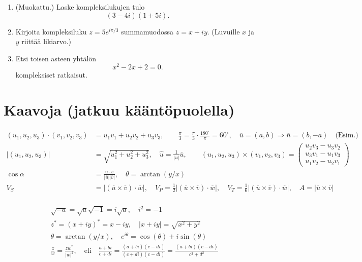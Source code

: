 \documentclass[12pt]{article}
\newcommand{\hatu}{\hat{u}}
\newcommand{\vu}{\overline{u}}
\newcommand{\vv}{\overline{v}}
\newcommand{\vw}{\overline{w}}
\newcommand{\vn}{\overline{n}}
\newcommand{\ratkaisu}[1]{\hfill{\color{blue}\quad\textrm{Ratkaisu: } #1}}
\renewcommand{\ratkaisu}[1]{}
\begin{document}
\begin{enumerate}
\item (Muokattu.) Laske kompleksilukujen tulo
$$
(3-4i)(1+5i).
$$\ratkaisu{$-17 + 19i$}

\item Kirjoita kompleksiluku $z=5e^{i\pi/3}$ summamuodossa $z=x+iy$. (Luvuille $x$ ja $y$ riittää likiarvo.) \ratkaisu{$z\approx 2.50 + 4.33i$}

\item Etsi toisen asteen yhtälön
$$
x^2-2x+2=0.
$$
kompleksiset ratkaisut.\ratkaisu{$x=1+i$ \textrm{ tai } $x=1-i$}
\end{enumerate}

\section*{Kaavoja (jatkuu kääntöpuolella)}

\begin{equation*}
\begin{split}
(u_1,u_2,u_3)\cdot(v_1,v_2,v_3)
&=u_1v_1+u_2v_2+u_3v_3,\qquad \frac{\pi}{3}=\frac{\pi}{3}\cdot\frac{180^\circ}{\pi}=60^\circ,\quad \vu=(a,b)\Rightarrow \vn=(b,-a)\quad \textrm{(Esim.)}\\
|(u_1,u_2,u_3)|&=\sqrt{u_1^2+u_2^2+u_3^2},
\quad \hatu=\frac{1}{|\vu|}\vu,
\qquad (u_1,u_2,u_3)\times(v_1,v_2,v_3)
=\begin{pmatrix}
u_2v_3-u_3v_2\\
u_3v_1-u_1v_3\\
u_1v_2-u_2v_1
\end{pmatrix}
\\
\cos\alpha&=\frac{\vu\cdot\vv}{|\vu||\vv|},
\quad \theta=\arctan(y/x)\\
V_S&=|(\vu\times\vv)\cdot\vw|,\quad
V_P=\frac{1}{2}|(\vu\times\vv)\cdot\vw|,\quad
V_T=\frac{1}{6}|(\vu\times\vv)\cdot\vw|,\quad
A=|\vu\times\vv|\\
\end{split}
\end{equation*}

\begin{equation*}
\begin{split}
&\sqrt{-a}=\sqrt{a}\sqrt{-1}=i\sqrt{a},\quad i^2=-1\\
&z^*=(x+iy)^*=x-iy,\quad |x+iy|=\sqrt{x^2+y^2}\\
&\theta=\arctan(y/x),\quad e^{i\theta}=\cos(\theta)+i\sin(\theta)\\
&\frac{z}{w}=\frac{zw^*}{|w|^2},\quad\textrm{eli}\quad
\frac{a+bi}{c+di}
=\frac{(a+bi)(c-di)}{(c+di)(c-di)}
=\frac{(a+bi)(c-di)}{c^2+d^2}
\end{split}
\end{equation*}
\end{document}
